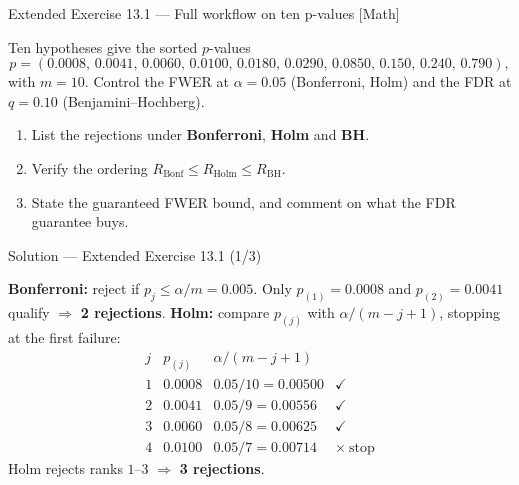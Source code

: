 \documentclass[aspectratio=169,11pt]{beamer}
\begin{document}
\begin{frame}{Extended Exercise 13.1 --- Full workflow on ten p-values [Math]}
\begin{longexercise}
  Ten hypotheses give the sorted $p$-values
  \[
    p=(0.0008,\,0.0041,\,0.0060,\,0.0100,\,0.0180,\,0.0290,\,0.0850,\,0.150,\,0.240,\,0.790),
  \]
  with $m=10$. Control the FWER at $\alpha=0.05$ (Bonferroni, Holm) and the FDR at
  $q=0.10$ (Benjamini--Hochberg).
  \begin{enumerate}
    \item List the rejections under \textbf{Bonferroni}, \textbf{Holm} and \textbf{BH}.
    \item Verify the ordering $R_{\text{Bonf}}\le R_{\text{Holm}}\le R_{\text{BH}}$.
    \item State the guaranteed FWER bound, and comment on what the FDR guarantee buys.
  \end{enumerate}
\end{longexercise}
\end{frame}

\begin{frame}{Solution --- Extended Exercise 13.1 (1/3)}
\begin{solutionbox}
  \textbf{Bonferroni:} reject if $p_j\le\alpha/m=0.005$. Only $p_{(1)}=0.0008$ and
  $p_{(2)}=0.0041$ qualify $\Rightarrow$ \textbf{2 rejections}.
  \medskip
  \textbf{Holm:} compare $p_{(j)}$ with $\alpha/(m-j+1)$, stopping at the first failure:
  \[
    \begin{array}{c|c|c|c}
      j & p_{(j)} & \alpha/(m-j+1) & \\ \hline
      1 & 0.0008 & 0.05/10=0.00500 & \checkmark\\
      2 & 0.0041 & 0.05/9=0.00556 & \checkmark\\
      3 & 0.0060 & 0.05/8=0.00625 & \checkmark\\
      4 & 0.0100 & 0.05/7=0.00714 & \times\ \text{stop}
    \end{array}
  \]
  Holm rejects ranks $1$--$3$ $\Rightarrow$ \textbf{3 rejections}.
\end{solutionbox}
\end{frame}
\end{document}
